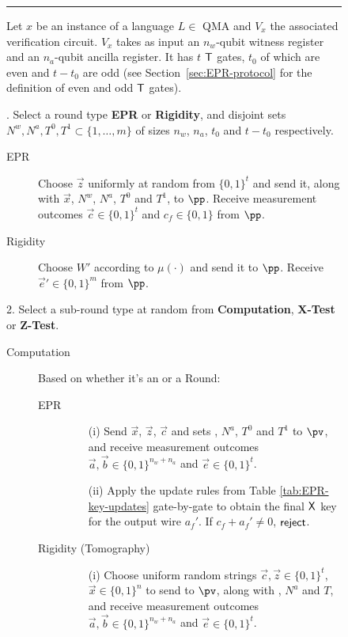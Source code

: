 \begin{figure}[H]
\rule[1ex]{\textwidth}{0.5pt}
\vspace{-20pt}
\justify
Let $x$ be an instance of a language $L \in$ QMA and $V_x$ the associated verification circuit. $V_x$ takes as input  an $n_w$-qubit witness register and an $n_a$-qubit ancilla register. It has $t$ $\sf T$ gates, $t_0$ of which are even and $t-t_0$ are odd (see Section~\ref{sec:EPR-protocol} for the definition of even and odd $\sf T$ gates).

. Select a round type \textbf{EPR} or \textbf{Rigidity}, and disjoint sets
  $N^w,N^a, T^0,T^1\subset \{1,\ldots,m\}$ of sizes $n_w$, $n_a$,  $t_0$ and $t-t_0$ respectively. 
\begin{description}
\item[EPR] Choose $\vec{z}$ uniformly at random from $\{0,1\}^t$ and send it,
  along with $\vec{x}$, $N^w$, $N^a$, $T^0$ and $T^1$, to $\pp$. Receive measurement outcomes $\vec{c}\in\{0,1\}^t$ and $c_f\in\{0,1\}$ from $\pp$.
\item[Rigidity] Choose $W'$ according to $\mu(\cdot)$ and send it to $\pp$. Receive $\vec{e}'\in \{0,1\}^m$ from $\pp$. 
\end{description}
2. Select a sub-round type at random from \textbf{Computation}, \textbf{X-Test} or \textbf{Z-Test}. 
\begin{description}
\item[Computation] Based on whether it's an  or a  Round:
	\begin{description}
	\item[EPR]
		\begin{enumerate}
		\item[(i)] Send $\vec{x}$, $\vec{z}$, $\vec{c}$ and sets , $N^a$, $T^0$
      and $T^1$ to $\pv$, and receive measurement outcomes $\vec{a},\vec{b}\in
        \{0,1\}^{n_w + n_a}$ and $\vec{e}\in\{0,1\}^t$.
		\item[(ii)] Apply the update rules from Table \ref{tab:EPR-key-updates} gate-by-gate to obtain the final $\sf X$ key for the output wire $a_f'$. If $c_f+a_f'\neq 0$, $\sf reject$. 
		\end{enumerate}
	\item[Rigidity (Tomography)]
		\begin{enumerate}
		\item[(i)] Choose uniform random strings $\vec{c},\vec{z}\in\{0,1\}^t$, $\vec{x} \in \{0,1\}^n$ 
      to send to $\pv$, along with , $N^a$ and $T$, and receive measurement outcomes $\vec{a}, \vec{b}\in \{0,1\}^{n_w + n_a}$ and $\vec{e}\in\{0,1\}^t$. 

\end{enumerate}
\end{description}
\end{description}
\end{figure}
